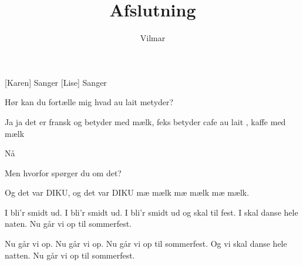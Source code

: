 \documentclass[a4paper,11pt]{article}
\title{Afslutning}
\author{Vilmar}
\begin{document}
\maketitle

\begin{roles}
[Karen] Sanger
[Lise] Sanger
\end{roles}

\begin{sketch}

 Hør kan du fortælle mig hvad au lait metyder?

 Ja ja det er fransk og betyder med mælk, feks betyder cafe au lait ,
kaffe med mælk

 Nå

 Men hvorfor spørger du om det?

\end{sketch}

\begin{song}
Og det var DIKU, og det var DIKU
mæ mælk
mæ mælk
mæ mælk.
\end{song}

\begin{sketch}
\end{sketch}

\begin{song}
I bli'r smidt ud.
I bli'r smidt ud.
I bli'r smidt ud og skal til fest.
I skal danse hele naten.
Nu går vi op til sommerfest.

Nu går vi op.
Nu går vi op.
Nu går vi op til sommerfest.
Og vi skal danse hele natten.
Nu går vi op til sommerfest.
\end{song}
\end{document}
